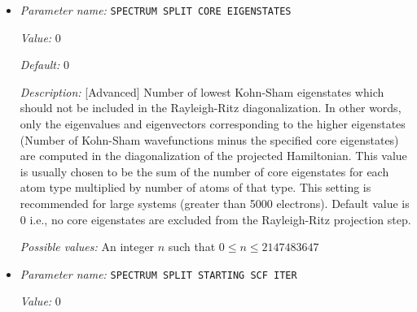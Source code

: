 \begin{itemize}
{\it Value:} 0


{\it Default:} 0


{\it Description:} [Advanced] ScaLAPACK process grid block size. Also sets the block size for ELPA if linked to ELPA. Default value of zero sets a heuristic block size. Note that if ELPA GPU KERNEL is set to true and ELPA is configured to run on GPUs, the SCALAPACK BLOCK SIZE is set to a power of 2.


{\it Possible values:} An integer $n$ such that $0\leq n \leq 300$
\item {\it Parameter name:} {\tt SPECTRUM SPLIT CORE EIGENSTATES}
\label{parameters:SCF parameters/Eigen_2dsolver parameters/SPECTRUM SPLIT CORE EIGENSTATES}
\label{parameters:SCF_20parameters/Eigen_2dsolver_20parameters/SPECTRUM_20SPLIT_20CORE_20EIGENSTATES}


{\it Value:} 0


{\it Default:} 0


{\it Description:} [Advanced] Number of lowest Kohn-Sham eigenstates which should not be included in the Rayleigh-Ritz diagonalization.  In other words, only the eigenvalues and eigenvectors corresponding to the higher eigenstates (Number of Kohn-Sham wavefunctions minus the specified core eigenstates) are computed in the diagonalization of the projected Hamiltonian. This value is usually chosen to be the sum of the number of core eigenstates for each atom type multiplied by number of atoms of that type. This setting is recommended for large systems (greater than 5000 electrons). Default value is 0 i.e., no core eigenstates are excluded from the Rayleigh-Ritz projection step.


{\it Possible values:} An integer $n$ such that $0\leq n \leq 2147483647$
\item {\it Parameter name:} {\tt SPECTRUM SPLIT STARTING SCF ITER}
\label{parameters:SCF parameters/Eigen_2dsolver parameters/SPECTRUM SPLIT STARTING SCF ITER}
\label{parameters:SCF_20parameters/Eigen_2dsolver_20parameters/SPECTRUM_20SPLIT_20STARTING_20SCF_20ITER}


{\it Value:} 0



\end{itemize}
